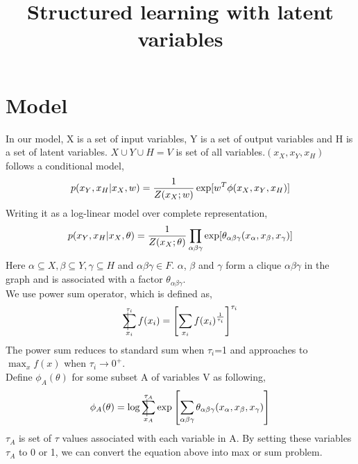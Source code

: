 \documentclass{article}
\title{Structured learning with latent variables}
\makeatletter
\newcommand{\avsum}{\mathop{\mathpalette\avsuminner\relax}\displaylimits}
\newcommand\avsuminner[2]{%
  {\sbox0{$\m@th#1\sum$}%
   \vphantom{\usebox0}%
   \ooalign{%
     \hidewidth
     \smash{\vrule height\dimexpr\ht0+1pt\relax depth\dimexpr\dp0+1pt\relax}%
     \hidewidth\cr
     $\m@th#1\sum$\cr
   }%
  }%
}
\makeatother
\begin{document}
\maketitle
\section{Model}
In our model, X is a set of input variables, Y is a set of output variables and H is a set of latent variables. $X\cup Y\cup H = V$ is set of all variables.$(x_X,x_Y,x_H)$ follows a
conditional model,
\begin{equation}
  p(x_Y,x_H|x_X,w)=\frac{1}{Z(x_X;w)}\exp[{w^T\phi(x_X,x_Y,x_H)}]\\
\end{equation}
Writing it as a log-linear model over complete representation,
\begin{equation}
  p(x_Y,x_H|x_X,\theta)=\frac{1}{Z(x_X;\theta)}\prod_{\alpha \beta \gamma}\exp[\theta_{\alpha\beta\gamma}(x_{\alpha},x_{\beta},x_{\gamma})]\\
\end{equation}
Here $\alpha\subseteq X, \beta\subseteq Y, \gamma\subseteq H$ and $\alpha\beta\gamma\in F$. $\alpha$, $\beta$ and $\gamma$ form a clique $\alpha\beta\gamma$ in the graph and is associated with a factor $\theta_{\alpha\beta\gamma}$.\\
We use power sum operator, which is defined as,\\
\begin{equation*}
\avsum_{x_i}^{\tau_i}f(x_i)=\left[\sum_{x_i}f(x_i)^{\frac{1}{\tau_i}}\right]^{\tau_i}
\end{equation*}
The power sum reduces to standard sum when $\tau_i$=1 and approaches to $\max_x f(x)$ when $\tau_i\to 0^+$.\\
Define $\phi_{A}(\theta)$ for some subset A of variables V as following,
\begin{align*}
\phi_A(\theta)&=\log\avsum_{x_A}^{\tau_A}\exp\left[ \sum_{\alpha\beta\gamma}\theta_{\alpha\beta\gamma}(x_{\alpha},x_{\beta},x_{\gamma})\right]\\
\end{align*}
$\tau_A$ is set of $\tau$ values associated with each variable in A. By setting these variables $\tau_A$ to 0 or 1, we can convert the equation above into max or sum problem.\\
\end{document}
